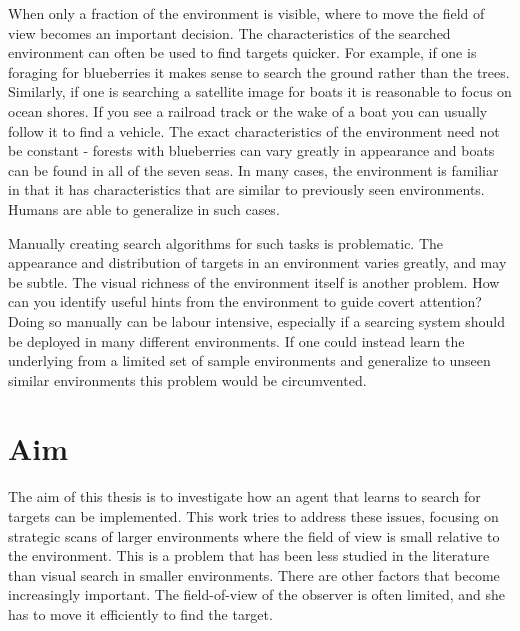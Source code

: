 When only a fraction of the environment is visible, where to move the field of view becomes an important decision.
The characteristics of the searched environment can often be used to find targets quicker.
For example, if one is foraging for blueberries it makes sense to search the ground rather than the trees.
Similarly, if one is searching a satellite image for boats it is reasonable to focus on ocean shores.
If you see a railroad track or the wake of a boat you can usually follow it to find a vehicle.
The exact characteristics of the environment need not be constant - forests with blueberries can vary greatly in appearance and boats can be found in all of the seven seas.
In many cases, the environment is familiar in that it has characteristics that are similar to previously seen environments.
Humans are able to generalize in such cases.



Manually creating search algorithms for such tasks is problematic.
The appearance and distribution of targets in an environment varies greatly, and may be subtle.
The visual richness of the environment itself is another problem.
How can you identify useful hints from the environment to guide covert attention?
Doing so manually can be labour intensive, especially if a searcing system should be deployed in many different environments.
If one could instead learn the underlying from a limited set of sample environments and generalize to unseen similar environments this problem would be circumvented.




\section{Aim}
\label{sec:aim}


The aim of this thesis is to investigate how an agent that learns to search for targets can be implemented.
This work tries to address these issues, focusing on strategic scans of larger environments where the field of view is small relative to the environment.
This is a problem that has been less studied in the literature than visual search in smaller environments.
There are other factors that become increasingly important. The field-of-view of the observer is often limited, and she has to move it efficiently to find the target.

